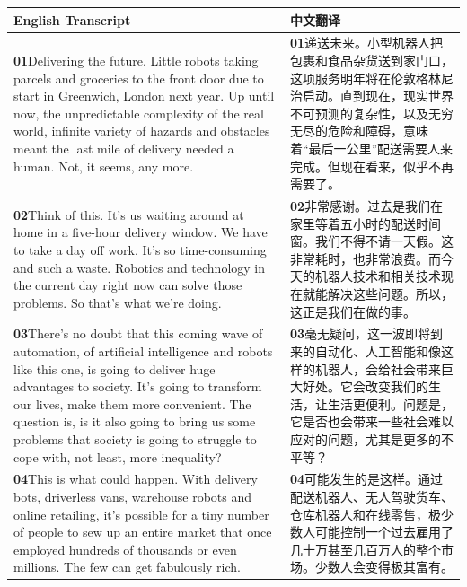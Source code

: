 \documentclass[UTF8,zihao=-4,fontset=fandol]{ctexart}
\newcommand{\TranscriptColumn}{\raggedright\arraybackslash\hyphenpenalty=10000\exhyphenpenalty=10000\sloppy}
\begin{document}
\renewcommand{\arraystretch}{1.23}
\begin{longtable}{>{\TranscriptColumn}p{} >{\TranscriptColumn}p{}}
\rowcolor{headerBg}\textbf{English Transcript} & \textbf{中文翻译} \\ \hline
\textbf{01}\quad Delivering the future. Little robots taking parcels and groceries to the front door due to start in Greenwich, London next year. Up until now, the unpredictable complexity of the real world, infinite variety of hazards and obstacles meant the last mile of delivery needed a human. Not, it seems, any more. & \textbf{01}\quad 递送未来。小型机器人把包裹和食品杂货送到家门口，这项服务明年将在伦敦格林尼治启动。直到现在，现实世界不可预测的复杂性，以及无穷无尽的危险和障碍，意味着“最后一公里”配送需要人来完成。但现在看来，似乎不再需要了。 \\ \hline
\textbf{02}\quad Think of this. It's us waiting around at home in a five-hour delivery window. We have to take a day off work. It's so time-consuming and such a waste. Robotics and technology in the current day right now can solve those problems. So that's what we're doing. & \textbf{02}\quad 非常感谢。过去是我们在家里等着五小时的配送时间窗。我们不得不请一天假。这非常耗时，也非常浪费。而今天的机器人技术和相关技术现在就能解决这些问题。所以，这正是我们在做的事。 \\ \hline
\textbf{03}\quad There's no doubt that this coming wave of automation, of artificial intelligence and robots like this one, is going to deliver huge advantages to society. It's going to transform our lives, make them more convenient. The question is, is it also going to bring us some problems that society is going to struggle to cope with, not least, more inequality? & \textbf{03}\quad 毫无疑问，这一波即将到来的自动化、人工智能和像这样的机器人，会给社会带来巨大好处。它会改变我们的生活，让生活更便利。问题是，它是否也会带来一些社会难以应对的问题，尤其是更多的不平等？ \\ \hline
\textbf{04}\quad This is what could happen. With delivery bots, driverless vans, warehouse robots and online retailing, it's possible for a tiny number of people to sew up an entire market that once employed hundreds of thousands or even millions. The few can get fabulously rich. & \textbf{04}\quad 可能发生的是这样。通过配送机器人、无人驾驶货车、仓库机器人和在线零售，极少数人可能控制一个过去雇用了几十万甚至几百万人的整个市场。少数人会变得极其富有。 \\ \hline

\end{longtable}
\end{document}
